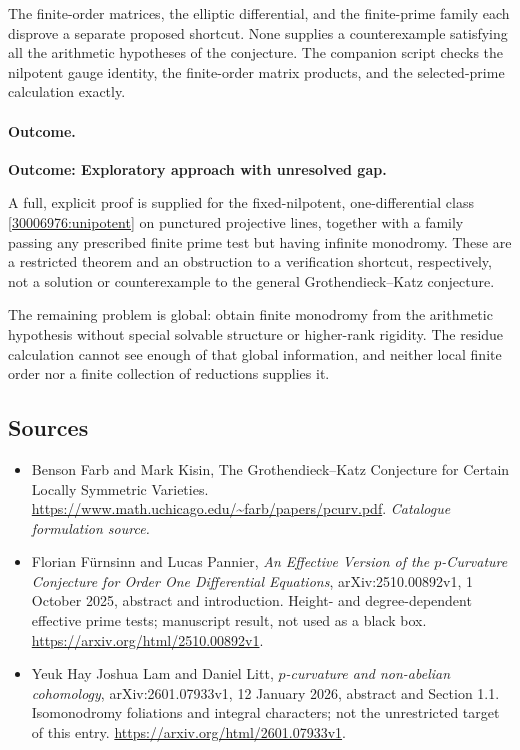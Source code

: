 \documentclass[11pt,a4paper]{article}
\numberwithin{equation}{section}
\begin{document}
The finite-order matrices, the elliptic differential, and the finite-prime
family each disprove a separate proposed shortcut. None supplies a
counterexample satisfying all the arithmetic hypotheses of the conjecture.
The companion script checks the nilpotent gauge identity, the finite-order
matrix products, and the selected-prime calculation exactly.

\paragraph{Outcome.}
\textbf{Outcome: Exploratory approach with unresolved gap.}

A full, explicit proof is supplied for the fixed-nilpotent, one-differential
class \eqref{30006976:unipotent} on punctured projective lines, together with a
family passing any prescribed finite prime test but having infinite
monodromy. These are a restricted theorem and an obstruction to a verification
shortcut, respectively, not a solution or counterexample to the general
Grothendieck--Katz conjecture.

The remaining problem is global: obtain finite monodromy from the arithmetic
hypothesis without special solvable structure or higher-rank rigidity.
The residue calculation cannot see enough of that global information, and
neither local finite order nor a finite collection of reductions supplies it.
\subsection{Sources}
\begin{itemize}\raggedright
\item[\textnormal{[S1]}]\hypertarget{source:30006976:1}{} Benson Farb and Mark Kisin, The Grothendieck–Katz Conjecture for Certain Locally Symmetric Varieties.
\url{https://www.math.uchicago.edu/~farb/papers/pcurv.pdf}.
{\small\textit{Catalogue formulation source.}}
\item[\textnormal{[E1]}]\hypertarget{extra:30006976:1}{} Florian F\"urnsinn and Lucas Pannier, \emph{An Effective Version of the $p$-Curvature Conjecture for Order One Differential Equations}, arXiv:2510.00892v1, 1 October 2025, abstract and introduction. Height- and degree-dependent effective prime tests; manuscript result, not used as a black box.
\url{https://arxiv.org/html/2510.00892v1}.
\item[\textnormal{[E2]}]\hypertarget{extra:30006976:2}{} Yeuk Hay Joshua Lam and Daniel Litt, \emph{$p$-curvature and non-abelian cohomology}, arXiv:2601.07933v1, 12 January 2026, abstract and Section 1.1. Isomonodromy foliations and integral characters; not the unrestricted target of this entry.
\url{https://arxiv.org/html/2601.07933v1}.
\end{itemize}
\end{document}
